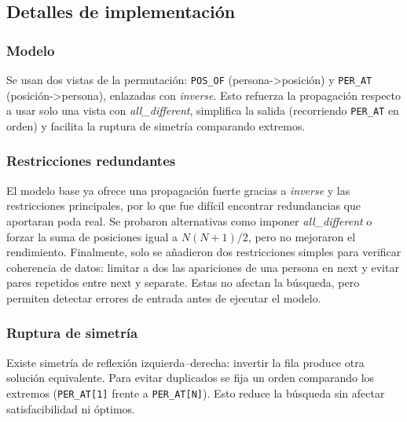 
\subsection{Detalles de implementación}\label{sec:05-reunion-impl}

\subsubsection*{Modelo}
Se usan dos vistas de la permutación: \texttt{POS\_OF} (persona->posición) y \texttt{PER\_AT} (posición->persona), enlazadas con \textit{inverse}. Esto refuerza la propagación respecto a usar solo una vista con \textit{all\_different}, simplifica la salida (recorriendo \texttt{PER\_AT} en orden) y facilita la ruptura de simetría comparando extremos.

\subsubsection*{Restricciones redundantes}
El modelo base ya ofrece una propagación fuerte gracias a \textit{inverse} y las restricciones principales, por lo que fue difícil encontrar redundancias que aportaran poda real. Se probaron alternativas como imponer \textit{all\_different} o forzar la suma de posiciones igual a \(N(N+1)/2\), pero no mejoraron el rendimiento. Finalmente, solo se añadieron dos restricciones simples para verificar coherencia de datos: limitar a dos las apariciones de una persona en \textsf{next} y evitar pares repetidos entre \textsf{next} y \textsf{separate}. Estas no afectan la búsqueda, pero permiten detectar errores de entrada antes de ejecutar el modelo.

\subsubsection*{Ruptura de simetría}
Existe simetría de reflexión izquierda–derecha: invertir la fila produce otra solución equivalente. Para evitar duplicados se fija un orden comparando los extremos (\texttt{PER\_AT[1]} frente a \texttt{PER\_AT[N]}). Esto reduce la búsqueda sin afectar satisfacibilidad ni óptimos.